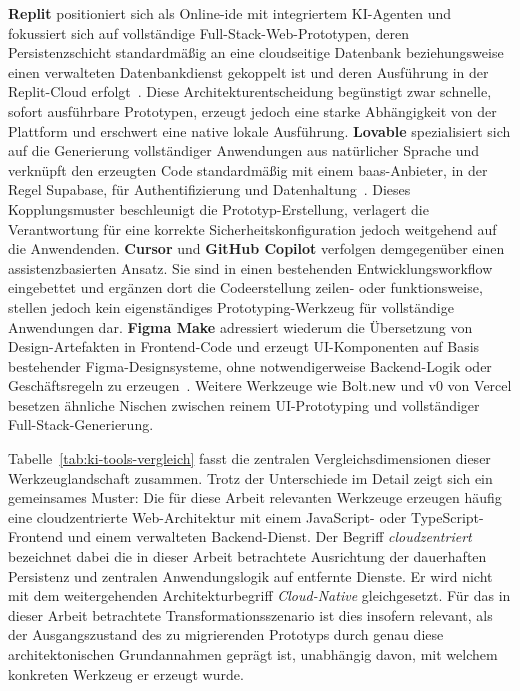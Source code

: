 \textbf{Replit} positioniert sich als Online-\gls{ide} mit integriertem KI-Agenten und fokussiert sich auf vollständige Full-Stack-Web-Prototypen, deren Persistenzschicht standardmäßig an eine cloudseitige Datenbank beziehungsweise einen verwalteten Datenbankdienst gekoppelt ist und deren Ausführung in der Replit-Cloud erfolgt~\cite{replit2026agent}.
Diese Architekturentscheidung begünstigt zwar schnelle, sofort ausführbare Prototypen, erzeugt jedoch eine starke Abhängigkeit von der Plattform und erschwert eine native lokale Ausführung.
\textbf{Lovable} spezialisiert sich auf die Generierung vollständiger Anwendungen aus natürlicher Sprache und verknüpft den erzeugten Code standardmäßig mit einem \gls{baas}-Anbieter, in der Regel Supabase, für Authentifizierung und Datenhaltung~\cite{lovable2026docs}.
Dieses Kopplungsmuster beschleunigt die Prototyp-Erstellung, verlagert die Verantwortung für eine korrekte Sicherheitskonfiguration jedoch weitgehend auf die Anwendenden.
\textbf{Cursor} und \textbf{GitHub Copilot} verfolgen demgegenüber einen assistenzbasierten Ansatz.
Sie sind in einen bestehenden Entwicklungsworkflow eingebettet und ergänzen dort die Codeerstellung zeilen- oder funktionsweise, stellen jedoch kein eigenständiges Prototyping-Werkzeug für vollständige Anwendungen dar.
\textbf{Figma Make} adressiert wiederum die Übersetzung von Design-Artefakten in Frontend-Code und erzeugt UI-Komponenten auf Basis bestehender Figma-Designsysteme, ohne notwendigerweise Backend-Logik oder Geschäftsregeln zu erzeugen~\cite{figma2026make}.
Weitere Werkzeuge wie Bolt.new und v0 von Vercel besetzen ähnliche Nischen zwischen reinem UI-Prototyping und vollständiger Full-Stack-Generierung.

Tabelle~\ref{tab:ki-tools-vergleich} fasst die zentralen Vergleichsdimensionen dieser Werkzeuglandschaft zusammen.
Trotz der Unterschiede im Detail zeigt sich ein gemeinsames Muster: Die für diese Arbeit relevanten Werkzeuge erzeugen häufig eine cloudzentrierte Web-Architektur mit einem JavaScript- oder TypeScript-Frontend und einem verwalteten Backend-Dienst.
Der Begriff \emph{cloudzentriert} bezeichnet dabei die in dieser Arbeit betrachtete Ausrichtung der dauerhaften Persistenz und zentralen Anwendungslogik auf entfernte Dienste.
Er wird nicht mit dem weitergehenden Architekturbegriff \emph{Cloud-Native} gleichgesetzt.
Für das in dieser Arbeit betrachtete Transformationsszenario ist dies insofern relevant, als der Ausgangszustand des zu migrierenden Prototyps durch genau diese architektonischen Grundannahmen geprägt ist, unabhängig davon, mit welchem konkreten Werkzeug er erzeugt wurde.


